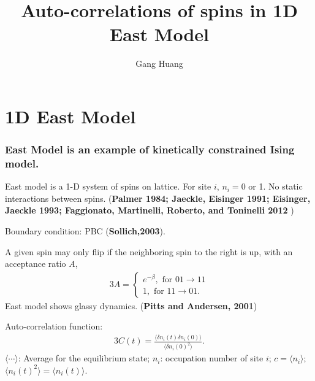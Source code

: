 \documentclass[8pt]{beamer}
\title{Auto-correlations of spins in 1D East Model}
\author{Gang Huang}
\begin{document}
\maketitle

\section{1D East Model}
\begin{frame}
	\frametitle{East Model is an example of kinetically constrained Ising model.} 
	East model is a 1-D system of spins on lattice. For site $i$, $n_i =0$ or 1. 	No static interactions between spins. (\textbf{Palmer 1984; Jaeckle, Eisinger 1991; Eisinger, Jaeckle 1993; Faggionato, Martinelli, Roberto, and Toninelli 2012 })
	
	Boundary condition:  PBC (\textbf{Sollich,2003}). 
	

	
	A given spin may only flip if the neighboring spin to the right is up, with an acceptance ratio $A$,
     \begin{alignat}{3}
       A = \left\{
       \begin{aligned}
	     e^{-\beta}, \text{ for } 01 \to 11 \\
         1, \text{ for } 11 \to 01.
       \end{aligned}
       \right
       .
     \end{alignat}
 East model shows glassy dynamics. (\textbf{Pitts and Andersen, 2001})
 
 Auto-correlation function:
      \begin{alignat}{3}
      C(t) = \frac{\langle\delta n_i(t)\delta n_i (0)\rangle}{\langle \delta n_i(0)^2 \rangle}.
 \end{alignat}
$\langle \cdots \rangle$: Average for the equilibrium state; $n_i$: occupation number of site $i$; $c = \langle n_i \rangle$; $\langle n_i(t)^2 \rangle = \langle n_i(t)\rangle$.
\end{frame}
\end{document}
